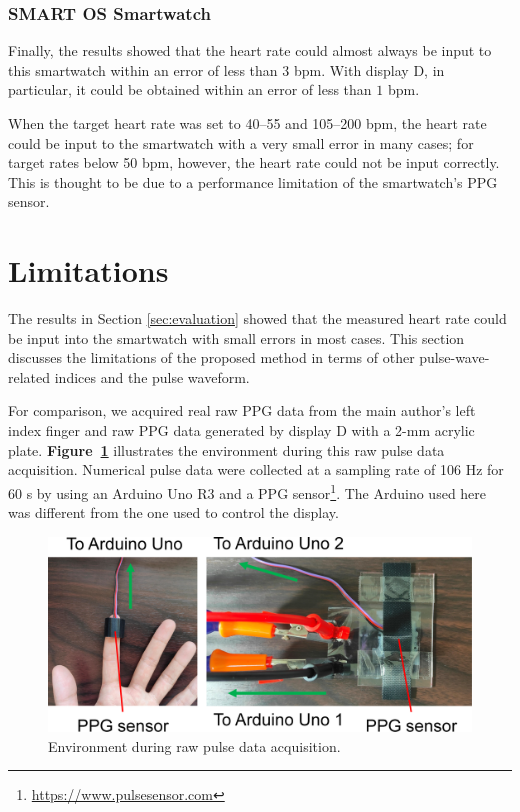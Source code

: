 \documentclass{ieeeaccess}
\newcommand\figref[1]{\textbf{Figure~\ref{fig:#1}}}
\begin{document}
\subsubsection{SMART OS Smartwatch}
Finally, the results showed that the heart rate could almost always be input to this smartwatch within an error of less than $3$ bpm. With display D, in particular, it could be obtained within an error of less than $1$ bpm.\par

When the target heart rate was set to 40--55 and 105--200 bpm, the heart rate could be input to the smartwatch with a very small error in many cases; for target rates below 50 bpm, however, the heart rate could not be input correctly. This is thought to be due to a performance limitation of the smartwatch's PPG sensor.



\section{Limitations}
\label{sec:limitation}
The results in Section \ref{sec:evaluation} showed that the measured heart rate could be input into the smartwatch with small errors in most cases. This section discusses the limitations of the proposed method in terms of other pulse-wave-related indices and the pulse waveform.\par

For comparison, we acquired real raw PPG data from the main author's left index finger and raw PPG data generated by display D with a 2-mm acrylic plate. \figref{raw_data_acquisition} illustrates the environment during this raw pulse data acquisition. Numerical pulse data were collected at a sampling rate of 106 Hz for 60 s by using an Arduino Uno R3 and a PPG sensor\footnote{\url{https://www.pulsesensor.com}}. The Arduino used here was different from the one used to control the display.

\begin{figure}[!t]
  \centering
  \includegraphics[width=1\linewidth]{figures/raw_data_acquisition.eps}
  \caption{Environment during raw pulse data acquisition.}
  \label{fig:raw_data_acquisition}
\end{figure}
\end{document}
